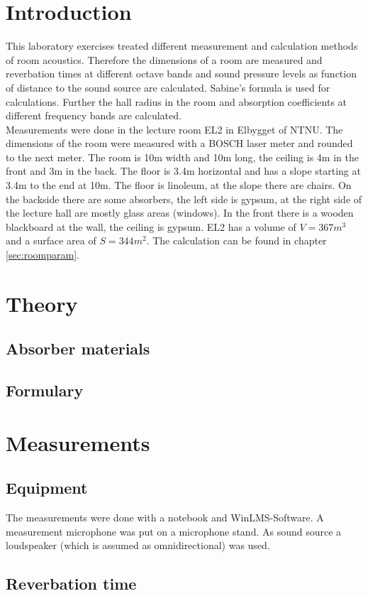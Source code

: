 \documentclass{article}
\begin{document}
\section{Introduction}
This laboratory exercises treated different measurement and calculation methods of room acoustics. Therefore the dimensions of a room are measured and reverbation times at different octave bands and sound pressure levels as function of distance to the sound source are calculated. Sabine's formula is used for calculations. Further the hall radius in the room and absorption coefficients at different frequency bands are calculated.\\
Measurements were done in the lecture room EL2 in Elbygget of NTNU. The dimensions of the room were measured with a BOSCH laser meter and rounded to the next meter. The room is 10m width and 10m long, the ceiling is 4m in the front and 3m in the back. The floor is 3.4m horizontal and has a slope starting at 3.4m to the end at 10m. The floor is linoleum, at the slope there are chairs. On the backside there are some absorbers, the left side is gypsum, at the right side of the lecture hall are mostly glass areas (windows). In the front there is a wooden blackboard at the wall, the ceiling is gypsum. EL2 has a volume of $V=367m^3$ and a surface area of $S=344m^2$. The calculation can be found in chapter \ref{sec:roomparam}.

\section{Theory}
\subsection{Absorber materials}

\subsection{Formulary}
\section{Measurements}
\subsection{Equipment}
The measurements were done with a notebook and WinLMS-Software. A measurement microphone was put on a microphone stand. As sound source a loudspeaker (which is assumed as omnidirectional) was used.
\subsection{Reverbation time}
\end{document}
